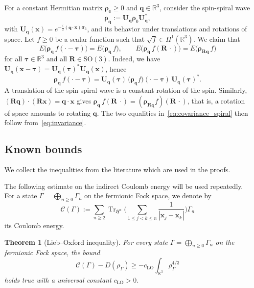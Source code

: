 \documentclass[final,reqno]{amsart}
\newtheorem{theorem}{Theorem}[section]
\theoremstyle{remark}
\renewcommand{\le}{\leqslant}
\renewcommand{\ge}{\geqslant}
\DeclareMathOperator{\Tr}{Tr}
\newcommand{\RR}{\mathbb{R}}
\newcommand{\SO}{\mathrm{SO}}
\newcommand{\LO}{\mathrm{LO}}
\newcommand{\Cc}{\mathcal{C}}
\newcommand{\HF}{\mathfrak{H}}
\begin{document}
For a constant Hermitian matrix $\bm{\rho}_0\ge0$ and $\mathbf{q}\in\RR^3$, consider the spin-spiral wave
$$
\bm{\rho}_{\mathbf{q}}:=\mathbf{U}_{\mathbf{q}}\bm{\rho}_0\mathbf{U}_{\mathbf{q}}^*,
$$
with $\mathbf{U}_{\mathbf{q}}(\mathbf{x})=e^{-\frac{i}2(\mathbf{q}\cdot\mathbf{x})\bm{\sigma}_3}$, and its behavior under translations and rotations of space. Let $f\ge0$ be a scalar function such that $\sqrt f\in H^1(\RR^3)$. We claim that
\begin{equation}\label{eq:covariance_spiral}
E\big(\bm{\rho}_{\mathbf{q}}\,f(\cdot-\bm{\tau})\big)=E\big(\bm{\rho}_{\mathbf{q}}\,f\big),\qquad E\big(\bm{\rho}_{\mathbf{q}}\,f(\mathbf{R}\,\cdot)\big)=E\big(\bm{\rho}_{\mathbf{R}\mathbf{q}}\,f\big)
\end{equation}
for all $\bm{\tau}\in\RR^3$ and all $\mathbf{R}\in\SO(3)$. Indeed, we have $\mathbf{U}_{\mathbf{q}}(\mathbf{x}-\bm{\tau})=\mathbf{U}_{\mathbf{q}}(\bm{\tau})^*\mathbf{U}_{\mathbf{q}}(\mathbf{x})$, hence
$$
\bm{\rho}_{\mathbf{q}}\,f(\cdot-\bm{\tau})=\mathbf{U}_{\mathbf{q}}(\bm{\tau})\,\big(\bm{\rho}_{\mathbf{q}}f\big)(\cdot-\bm{\tau})\,\mathbf{U}_{\mathbf{q}}(\bm{\tau})^*.
$$
A translation of the spin-spiral wave is a constant rotation of the spin. Similarly, $(\mathbf{R}\mathbf{q})\cdot(\mathbf{R}\mathbf{x})=\mathbf{q}\cdot\mathbf{x}$ gives $\bm{\rho}_{\mathbf{q}}\,f(\mathbf{R}\,\cdot)=(\bm{\rho}_{\mathbf{R}\mathbf{q}}f)(\mathbf{R}\,\cdot)$, that is, a rotation of space amounts to rotating $\mathbf{q}$. The two equalities in~\cref{eq:covariance_spiral} then follow from~\cref{eq:invariance}.

\subsection{Known bounds}\label{sec:known_bounds}
We collect the inequalities from the literature which are used in the proofs.

The following estimate on the indirect Coulomb energy will be used repeatedly. For a state $\Gamma=\bigoplus_{n\ge0}\Gamma_n$ on the fermionic Fock space, we denote by
$$
\Cc(\Gamma):=\sum_{n\ge2}\Tr_{\HF^n}\Bigg(\sum_{1\le j<k\le n}\frac1{|\mathbf{x}_j-\mathbf{x}_k|}\Bigg)\Gamma_n
$$
its Coulomb energy.

\begin{theorem}[Lieb--Oxford inequality]\label{thm:LO}
For every state $\Gamma=\bigoplus_{n\ge0}\Gamma_n$ on the fermionic Fock space, the bound
\begin{equation*}
\Cc(\Gamma)-D(\rho_\Gamma)\ge-c_\LO\int_{\RR^3}\rho_\Gamma^{4/3}
\end{equation*}
holds true with a universal constant $c_\LO>0$.
\end{theorem}
\end{document}
